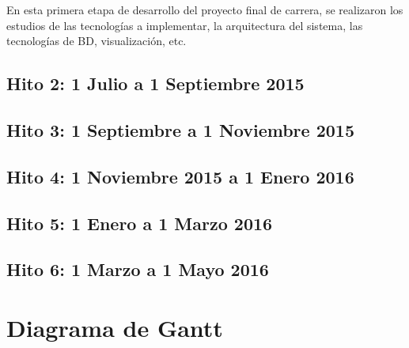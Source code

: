 En esta primera etapa de desarrollo del proyecto final de carrera, se realizaron los estudios de las tecnologías a implementar, la arquitectura del sistema, las tecnologías de BD, visualización, etc.

\subsection{Hito 2: 1 Julio a 1 Septiembre 2015}
\label{subsec:hito2}



\subsection{Hito 3: 1 Septiembre a 1 Noviembre 2015}
\label{subsec:hito3}


\subsection{Hito 4: 1 Noviembre 2015 a 1 Enero 2016}
\label{subsec:hito4}



\subsection{Hito 5: 1 Enero a 1 Marzo 2016}
\label{subsec:hito5}



\subsection{Hito 6: 1 Marzo a 1 Mayo 2016}
\label{subsec:hito6}


\section{Diagrama de Gantt}



